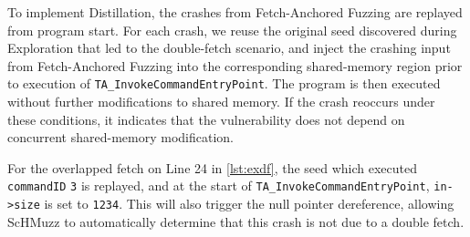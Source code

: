 \documentclass[conference]{IEEEtran}
\newcommand{\sysname}{ScHMuzz\xspace}
\newcommand{\stageone}{Exploration\xspace}
\newcommand{\stagetwo}{Fetch-Anchored Fuzzing\xspace}
\newcommand{\stagethree}{Distillation\xspace}
\begin{document}



To implement \stagethree, the crashes from \stagetwo are replayed from program start. For each crash, 
we reuse the original seed discovered 
during \stageone that led to the double-fetch scenario, and inject the crashing input from \stagetwo 
into the corresponding shared-memory region prior to execution of \texttt{TA\_InvokeCommandEntryPoint}. 
The program is then executed without further 
modifications to shared memory. If the crash reoccurs under these conditions, it indicates that the 
vulnerability does not depend on concurrent shared-memory modification. 


For the overlapped fetch on Line 24 in \autoref{lst:exdf}, the seed which executed \texttt{commandID} 
\texttt{3} is replayed, and at the start of \texttt{TA\_InvokeCommandEntryPoint}, \texttt{in->size} is set to 
\texttt{1234}. This will also trigger the null pointer dereference, allowing \sysname to automatically 
determine that this crash is not due to a double fetch.

\end{document}
